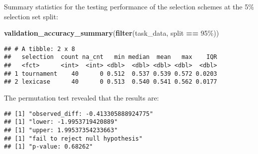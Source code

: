 \documentclass[
]{book}
\newenvironment{Shaded}{\begin{snugshade}}{\end{snugshade}}
\newcommand{\AttributeTok}[1]{\textcolor[rgb]{0.13,0.29,0.53}{#1}}
\newcommand{\DecValTok}[1]{\textcolor[rgb]{0.00,0.00,0.81}{#1}}
\newcommand{\FunctionTok}[1]{\textcolor[rgb]{0.13,0.29,0.53}{\textbf{#1}}}
\newcommand{\NormalTok}[1]{#1}
\newcommand{\OtherTok}[1]{\textcolor[rgb]{0.56,0.35,0.01}{#1}}
\newcommand{\SpecialCharTok}[1]{\textcolor[rgb]{0.81,0.36,0.00}{\textbf{#1}}}
\newcommand{\StringTok}[1]{\textcolor[rgb]{0.31,0.60,0.02}{#1}}
\begin{document}
Summary statistics for the testing performance of the selection schemes at the 5\% selection set split:

\begin{Shaded}
\begin{Highlighting}[]
\FunctionTok{validation\_accuracy\_summary}\NormalTok{(}\FunctionTok{filter}\NormalTok{(task\_data, split }\SpecialCharTok{==} \StringTok{\textquotesingle{}95\%\textquotesingle{}}\NormalTok{))}
\end{Highlighting}
\end{Shaded}

\begin{verbatim}
## # A tibble: 2 x 8
##   selection  count na_cnt   min median  mean   max    IQR
##   <fct>      <int>  <int> <dbl>  <dbl> <dbl> <dbl>  <dbl>
## 1 tournament    40      0 0.512  0.537 0.539 0.572 0.0203
## 2 lexicase      40      0 0.513  0.540 0.541 0.562 0.0177
\end{verbatim}

The permutation test revealed that the results are:

\begin{Shaded}
\end{Shaded}

\begin{verbatim}
## [1] "observed_diff: -0.413305888924775"
## [1] "lower: -1.9953719420889"
## [1] "upper: 1.99537354233663"
## [1] "fail to reject null hypothesis"
## [1] "p-value: 0.68262"
\end{verbatim}
\end{document}
